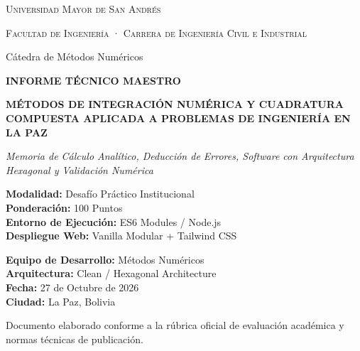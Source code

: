 \documentclass[11pt,a4paper]{article}
\begin{document}
\begin{titlepage}
    \centering
    \vspace*{1.0cm}
    
    {\scshape\Large Universidad Mayor de San Andrés\par}
    {\scshape\large Facultad de Ingeniería · Carrera de Ingeniería Civil e Industrial\par}
    \vspace{0.4cm}
    {\large Cátedra de Métodos Numéricos\par}
    
    \vspace{2.0cm}
    \begin{tcolorbox}[colback=NavyBlue,colframe=NavyBlue,arc=6pt,boxrule=0pt,top=16pt,bottom=16pt]
        \centering
        \color{white}
        {\Huge\bfseries INFORME TÉCNICO MAESTRO\par}
        \vspace{0.4cm}
        {\Large\bfseries MÉTODOS DE INTEGRACIÓN NUMÉRICA Y CUADRATURA COMPUESTA APLICADA A PROBLEMAS DE INGENIERÍA EN LA PAZ\par}
        \vspace{0.3cm}
        {\normalsize\itshape Memoria de Cálculo Analítico, Deducción de Errores, Software con Arquitectura Hexagonal y Validación Numérica\par}
    \end{tcolorbox}
    
    \vspace{2.5cm}
    
    \begin{minipage}[t]{0.48\textwidth}
        \flushleft
        \textbf{\color{NavyBlue}Modalidad:} Desafío Práctico Institucional\\
        \textbf{\color{NavyBlue}Ponderación:} 100 Puntos\\
        \textbf{\color{NavyBlue}Entorno de Ejecución:} ES6 Modules / Node.js\\
        \textbf{\color{NavyBlue}Despliegue Web:} Vanilla Modular + Tailwind CSS
    \end{minipage}
    \hfill
    \begin{minipage}[t]{0.48\textwidth}
        \flushright
        \textbf{\color{NavyBlue}Equipo de Desarrollo:} Métodos Numéricos\\
        \textbf{\color{NavyBlue}Arquitectura:} Clean / Hexagonal Architecture\\
        \textbf{\color{NavyBlue}Fecha:} 27 de Octubre de 2026\\
        \textbf{\color{NavyBlue}Ciudad:} La Paz, Bolivia
    \end{minipage}
    
    \vfill
    {\small Documento elaborado conforme a la rúbrica oficial de evaluación académica y normas técnicas de publicación.\par}
\end{titlepage}
\end{document}
